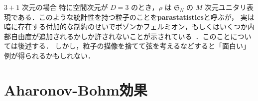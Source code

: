 \documentclass[TQFT_main]{subfiles}
\begin{document}
\begin{myexample}[label=ex:1-3nonabelian]{$3+1$ 次元の場合}
    特に空間次元が $D=3$ のとき，$\rho$ は $\mathfrak{S}_N$ の $M$ 次元ユニタリ表現である．このような統計性を持つ粒子のことを\textbf{parastatistics}と呼ぶが，
    実は暗に存在する付加的な制約のせいでボゾンかフェルミオン，もしくはいくつか内部自由度が追加されるかしか許されないことが示されている~\cite[Appendix B]{HalvorsonMuger2006}．このことについては後述する．
    しかし，粒子の描像を捨てて弦を考えるなどすると「面白い」例が得られるかもしれない．
\end{myexample}

\section{Aharonov-Bohm効果}
\end{document}
